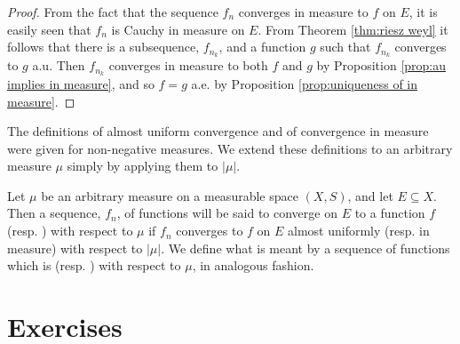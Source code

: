 \begin{proof}
From the fact that the sequence $f_n$ converges in measure to $f$ on $E$, it is easily seen that $f_n$ is Cauchy in measure on $E$. From Theorem \ref{thm:riesz weyl} it follows that there is a subsequence, $f_{n_k}$, and a function $g$ such that $f_{n_k}$ converges to $g$ a.u. Then $f_{n_k}$ converges in measure to both $f$ and $g$ by Proposition \ref{prop:au implies in measure}, and so $f=g$ a.e. by Proposition \ref{prop:uniqueness of in measure}.
\end{proof}

The definitions of almost uniform convergence and of convergence in measure were given for non-negative measures. We extend these definitions to an arbitrary measure $\mu$ simply by applying them to $|\mu|$.

\begin{definition}
Let $\mu$ be an arbitrary measure on a measurable space $(X, S)$, and let $E\subseteq X$. Then a sequence, $f_n$, of functions will be said to converge on $E$ to a function $f$  (resp. ) with respect to $\mu$ if $f_n$ converges to $f$ on $E$ almost uniformly (resp. in measure) with respect to $|\mu|$. We define what is meant by a sequence of functions which is  (resp. ) with respect to $\mu$, in analogous fashion. 
\end{definition}

\section{Exercises}

